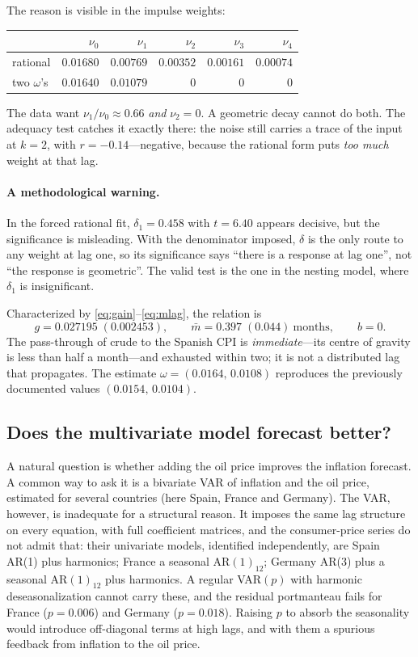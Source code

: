 \documentclass[11pt,a4paper]{article}
\theoremstyle{plain}
\theoremstyle{remark}
\begin{document}
The reason is visible in the impulse weights:
\begin{center}
\begin{tabular}{lrrrrr}
\toprule
 & $\nu_0$ & $\nu_1$ & $\nu_2$ & $\nu_3$ & $\nu_4$\\
\midrule
rational        & $0.01680$ & $0.00769$ & $0.00352$ & $0.00161$ & $0.00074$\\
two $\omega$'s  & $0.01640$ & $0.01079$ & $0$ & $0$ & $0$\\
\bottomrule
\end{tabular}
\end{center}
The data want $\nu_1/\nu_0 \approx 0.66$ \emph{and} $\nu_2 = 0$. A geometric decay
cannot do both. The adequacy test catches it exactly there: the noise still
carries a trace of the input at $k=2$, with $r=-0.14$---negative, because the
rational form puts \emph{too much} weight at that lag.

\paragraph{A methodological warning.} In the forced rational fit, $\delta_1 =
0.458$ with $t=6.40$ appears decisive, but the significance is misleading. With the
denominator imposed, $\delta$ is the only route to any weight at lag one, so its
significance says ``there is a response at lag one'', not ``the response is
geometric''. The valid test is the one in the nesting model, where $\delta_1$ is
insignificant.

Characterized by \eqref{eq:gain}--\eqref{eq:mlag}, the relation is
\[
g = 0.027195 \;(0.002453),\qquad
\bar{m} = 0.397 \;(0.044)\ \text{months},\qquad b=0 .
\]
The pass-through of crude to the Spanish CPI is \emph{immediate}---its centre of
gravity is less than half a month---and exhausted within two; it is not a
distributed lag that propagates. The estimate $\omega = (0.0164,\,0.0108)$
reproduces the previously documented values $(0.0154,\,0.0104)$.


\subsection{Does the multivariate model forecast better?}
\label{sec:passthrough}

A natural question is whether adding the oil price improves the inflation forecast.
A common way to ask it is a bivariate VAR of inflation and the oil price, estimated
for several countries (here Spain, France and Germany). The VAR, however, is
inadequate for a structural reason. It imposes the same lag structure on every
equation, with full coefficient matrices, and the consumer-price series do not
admit that: their univariate models, identified independently, are Spain AR(1)
plus harmonics; France a seasonal AR$(1)_{12}$; Germany AR(3) plus a seasonal
AR$(1)_{12}$ plus harmonics. A regular VAR$(p)$ with harmonic deseasonalization
cannot carry these, and the residual portmanteau fails for France ($p=0.006$) and
Germany ($p=0.018$). Raising $p$ to absorb the seasonality would introduce
off-diagonal terms at high lags, and with them a spurious feedback from inflation
to the oil price.
\end{document}
